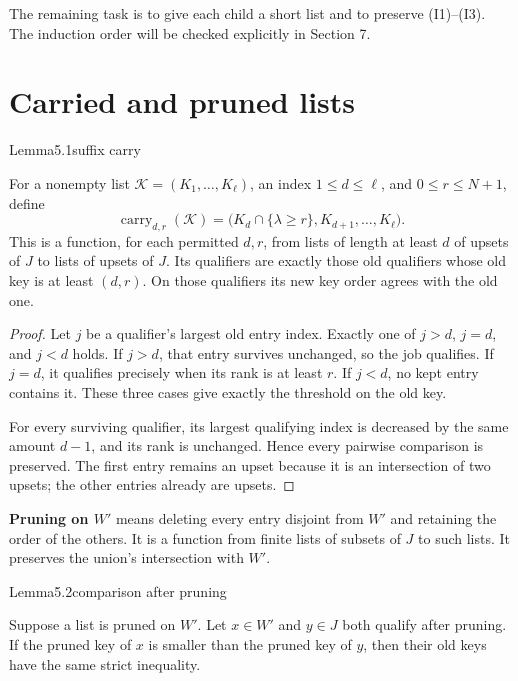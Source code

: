 The remaining task is to give each child a short list and to preserve (I1)--(I3). The induction order will be checked explicitly in Section 7.

\section{Carried and pruned lists}

\begin{numbered}{Lemma}{5.1}{suffix carry}

For a nonempty list \(\mathcal K=(K_1,\ldots,K_\ell)\), an index \(1\leq d\leq\ell\), and \(0\leq r\leq N+1\), define \[
\operatorname{carry}_{d,r}(\mathcal K)
=
\bigl(K_d\cap\{\lambda\geq r\},K_{d+1},\ldots,K_\ell\bigr).
\tag{5.1}
\] This is a function, for each permitted \(d,r\), from lists of length at least \(d\) of upsets of \(J\) to lists of upsets of \(J\). Its qualifiers are exactly those old qualifiers whose old key is at least \((d,r)\). On those qualifiers its new key order agrees with the old one.

\end{numbered}

\begin{proof}
Let \(j\) be a qualifier's largest old entry index. Exactly one of \(j>d\), \(j=d\), and \(j<d\) holds. If \(j>d\), that entry survives unchanged, so the job qualifies. If \(j=d\), it qualifies precisely when its rank is at least \(r\). If \(j<d\), no kept entry contains it. These three cases give exactly the threshold on the old key.

For every surviving qualifier, its largest qualifying index is decreased by the same amount \(d-1\), and its rank is unchanged. Hence every pairwise comparison is preserved. The first entry remains an upset because it is an intersection of two upsets; the other entries already are upsets.
\end{proof}

\textbf{Pruning on \(W'\)} means deleting every entry disjoint from \(W'\) and retaining the order of the others. It is a function from finite lists of subsets of \(J\) to such lists. It preserves the union's intersection with \(W'\).

\begin{numbered}{Lemma}{5.2}{comparison after pruning}

Suppose a list is pruned on \(W'\). Let \(x\in W'\) and \(y\in J\) both qualify after pruning. If the pruned key of \(x\) is smaller than the pruned key of \(y\), then their old keys have the same strict inequality.

\end{numbered}


